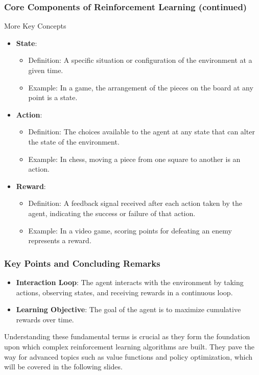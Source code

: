 \documentclass[aspectratio=169]{beamer}
\begin{document}
\begin{frame}[fragile]
    \frametitle{Core Components of Reinforcement Learning (continued)}
    \begin{block}{More Key Concepts}
        \begin{itemize}
            \item \textbf{State}:
                \begin{itemize}
                    \item Definition: A specific situation or configuration of the environment at a given time.
                    \item Example: In a game, the arrangement of the pieces on the board at any point is a state.
                \end{itemize}
            \item \textbf{Action}:
                \begin{itemize}
                    \item Definition: The choices available to the agent at any state that can alter the state of the environment.
                    \item Example: In chess, moving a piece from one square to another is an action.
                \end{itemize}
            \item \textbf{Reward}:
                \begin{itemize}
                    \item Definition: A feedback signal received after each action taken by the agent, indicating the success or failure of that action.
                    \item Example: In a video game, scoring points for defeating an enemy represents a reward.
                \end{itemize}
        \end{itemize}
    \end{block}
\end{frame}

\begin{frame}[fragile]
    \frametitle{Key Points and Concluding Remarks}
    \begin{itemize}
        \item \textbf{Interaction Loop}: The agent interacts with the environment by taking actions, observing states, and receiving rewards in a continuous loop.
        \item \textbf{Learning Objective}: The goal of the agent is to maximize cumulative rewards over time.
    \end{itemize}
    
    Understanding these fundamental terms is crucial as they form the foundation upon which complex reinforcement learning algorithms are built. They pave the way for advanced topics such as value functions and policy optimization, which will be covered in the following slides.
\end{frame}
\end{document}
